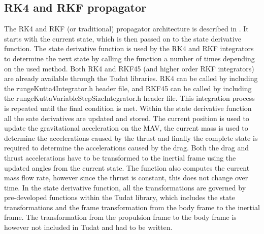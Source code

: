%






\subsection{\ac{RK4} and \ac{RKF} propagator}
\label{subsec:rkpropagator}
The \ac{RK4} and \ac{RKF} (or traditional) propagator architecture is described in . It starts with the current state, which is then passed on to the state derivative function. The state derivative function is used by the \ac{RK4} and \ac{RKF} integrators to determine the next state by calling the function a number of times depending on the used method. Both \ac{RK4} and \ac{RKF45} (and higher order \ac{RKF} integrators) are already available through the \ac{Tudat} libraries. \ac{RK4} can be called by including the rungeKutta4Integrator.h header file, and \ac{RKF45} can be called by including the rungeKuttaVariableStepSizeIntegrator.h header file. This integration process is repeated until the final condition is met. Within the state derivative function all the sate derivatives are updated and stored. The current position is used to update the gravitational acceleration on the \ac{MAV}, the current mass is used to determine the accelerations caused by the thrust and finally the complete state is required to determine the accelerations caused by the drag. Both the drag and thrust accelerations have to be transformed to the inertial frame using the updated angles from the current state. The function also computes the current mass flow rate, however since the thrust is constant, this does not change over time. In the state derivative function, all the transformations are governed by pre-developed functions within the \ac{Tudat} library, which includes the state transformations and the frame transformation from the body frame to the inertial frame. The transformation from the propulsion frame to the body frame is however not included in \ac{Tudat} and had to be written.


